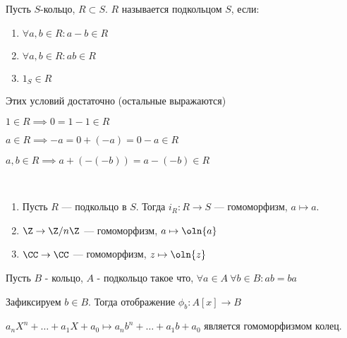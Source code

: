\begin{defn}
    Пусть $S$-кольцо, $R \subset S$. $R$ называется подкольцом $S$, если:

    \begin{enumerate}
        \item $\forall a, b \in R: a - b \in R$
        
        \item $\forall a, b \in R: ab \in R$
        
        \item $1_S \in R$
    \end{enumerate}
\end{defn}

\begin{notice} Этих условий достаточно (остальные выражаются)

    $1 \in R \implies 0 = 1 - 1 \in R$

    $a \in R \implies -a = 0 + (-a) = 0 - a \in R$

    $a, b \in R \implies a + (-(-b)) = a - (-b) \in R$
    
\end{notice}

\begin{examples}~
    
    \begin{enumerate}
        \item Пусть $R$ --- подкольцо в $S$. Тогда $i_R: R \to S$ --- гомоморфизм, $a \mapsto a$.
        
        \item $\Z \to \Z/n\Z$ --- гомоморфизм, $a \mapsto \oln{a}$
        
        \item $\CC \to \CC$ --- гомоморфизм, $z \mapsto \oln{z}$
    \end{enumerate}

\end{examples}

\begin{theorem}
    Пусть $B$ - кольцо, $A$ - подкольцо такое что, $\forall a \in A~\forall b \in B: ab = ba$
    
    Зафиксируем $b \in B$. Тогда отображение $\phi_b: A[x] \to B$

    $a_n X^n + \ldots + a_1X + a_0 \mapsto a_n b^n + \ldots + a_1 b + a_0$ является гомоморфизмом колец.
\end{theorem}

